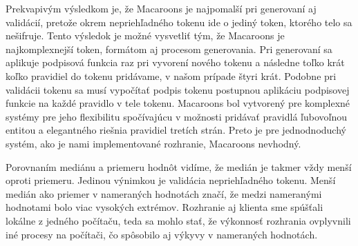 Prekvapivým výsledkom je, že Macaroons je najpomalší pri generovaní aj validácií, pretože okrem nepriehľadného tokenu ide o jediný token, ktorého telo sa nešifruje. Tento výsledok je možné vysvetliť tým, že Macaroons je najkomplexnejší token, formátom aj procesom generovania. Pri generovaní sa aplikuje podpisová funkcia raz pri vyvorení nového tokenu a následne toľko krát koľko pravidiel do tokenu pridávame, v našom prípade štyri krát. Podobne pri validácii tokenu sa musí vypočítať podpis tokenu postupnou aplikáciu podpisovej funkcie na každé pravidlo v tele tokenu. Macaroons bol vytvorený pre komplexné systémy pre jeho flexibilitu spočívajúcu v možnosti pridávať pravidlá ľubovoľnou entitou a elegantného riešnia pravidiel tretích strán. Preto je pre jednodnoduchý systém, ako je nami implementované rozhranie, Macaroons nevhodný.

Porovnaním mediánu a priemeru hodnôt vidíme, že medián je takmer vždy menší oproti priemeru. Jedinou výnimkou je validácia nepriehľadného tokenu. Menší medián ako priemer v nameraných hodnotách značí, že medzi nameranými hodnotami bolo viac vysokých extrémov. Rozhranie aj klienta sme spúšťali lokálne z jedného počítaču, teda sa mohlo stať, že výkonnosť rozhrania ovplyvnili iné procesy na počítači, čo spôsobilo aj výkyvy v nameraných hodnotách.